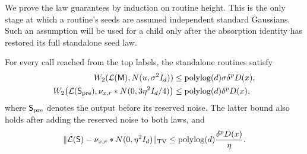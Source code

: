 We prove the law guarantees by induction on routine height.  This is
the only stage at which a routine's seeds are assumed independent
standard Gaussians.  Such an assumption will be used for a child only
after the absorption identity has restored its full standalone seed
law.

\begin{proposition}
\label{prop:compiler-accuracy}
For every call reached from the top labels, the standalone routines
satisfy
\begin{align*}
 W_2(\mathcal L(\mathsf M),N(u,\sigma^2I_d))
 &\le\operatorname{polylog}(d)\sigma\delta^pD(x),\\
 W_2\bigl(\mathcal L(\mathsf S_{\rm pre}),
       \nu_{x,r}*N(0,3\eta^2I_d/4)\bigr)
 &\le\operatorname{polylog}(d)\delta^pD(x),
\end{align*}
where $\mathsf S_{\rm pre}$ denotes the output before its reserved
noise.  The latter bound also holds after adding the reserved noise
to both laws, and
\[
 \|\mathcal L(\mathsf S)-\nu_{x,r}*N(0,\eta^2I_d)\|_{\mathrm{TV}}
 \le\operatorname{polylog}(d)\frac{\delta^pD(x)}{\eta}.
\]
\end{proposition}

